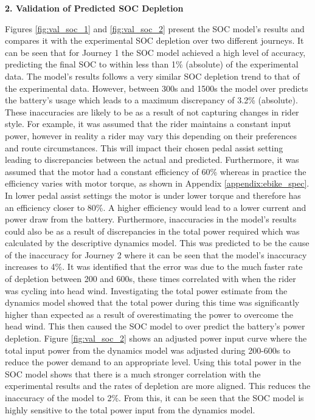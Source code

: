 \documentclass[a4paper, 10pt]{article}
\numberwithin{equation}{section}
\begin{document}
\textbf{2. Validation of Predicted SOC Depletion}

Figures \ref{fig:val_soc_1} and \ref{fig:val_soc_2} present the SOC model's results and compares it with the experimental SOC depletion over two different journeys. It can be seen that for Journey 1 the SOC model achieved a high level of accuracy, predicting the final SOC to within less than 1\% (absolute) of the experimental data. The model's results follows a very similar SOC depletion trend to that of the experimental data. However, between 300s and 1500s the model over predicts the battery's usage which leads to a maximum discrepancy of 3.2\% (absolute). These inaccuracies are likely to be as a result of not capturing changes in rider style. For example, it was assumed that the rider maintains a constant input power, however in reality a rider may vary this depending on their preferences and route circumstances. This will impact their chosen pedal assist setting leading to discrepancies between the actual and predicted. Furthermore, it was assumed that the motor had a constant efficiency of 60\% whereas in practice the efficiency varies with motor torque, as shown in Appendix \ref{appendix:ebike_spec}. In lower pedal assist settings the motor is under lower torque and therefore has an efficiency closer to 80\%. A higher efficiency would lead to a lower current and power draw from the battery. Furthermore, inaccuracies in the model's results could also be as a result of discrepancies in the total power required which was calculated by the descriptive dynamics model. This was predicted to be the cause of the inaccuracy for Journey 2 where it can be seen that the model's inaccuracy increases to 4\%. It was identified that the error was due to the much faster rate of depletion between 200 and 600s, these times correlated with when the rider was cycling into head wind. Investigating the total power estimate from the dynamics model showed that the total power during this time was significantly higher than expected as a result of overestimating the power to overcome the head wind. This then caused the SOC model to over predict the battery's power depletion. Figure \ref{fig:val_soc_2} shows an adjusted power input curve where the total input power from the dynamics model was adjusted during 200-600s to reduce the power demand to an appropriate level. Using this total power in the SOC model shows that there is a much stronger correlation with the experimental results and the rates of depletion are more aligned. This reduces the inaccuracy of the model to 2\%. From this, it can be seen that the SOC model is highly sensitive to the total power input from the dynamics model.
\end{document}
